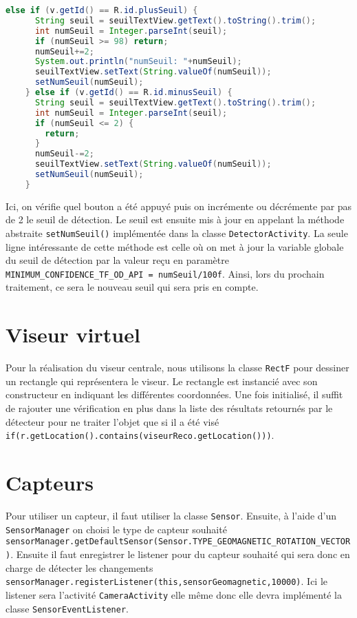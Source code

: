 \documentclass[UTF8]{EPURapport}
\begin{document}
\begin{lstlisting}[language=Java]
	else if (v.getId() == R.id.plusSeuil) {
      String seuil = seuilTextView.getText().toString().trim();
      int numSeuil = Integer.parseInt(seuil);
      if (numSeuil >= 98) return;
      numSeuil+=2;
      System.out.println("numSeuil: "+numSeuil);
      seuilTextView.setText(String.valueOf(numSeuil));
      setNumSeuil(numSeuil);
    } else if (v.getId() == R.id.minusSeuil) {
      String seuil = seuilTextView.getText().toString().trim();
      int numSeuil = Integer.parseInt(seuil);
      if (numSeuil <= 2) {
        return;
      }
      numSeuil-=2;
      seuilTextView.setText(String.valueOf(numSeuil));
      setNumSeuil(numSeuil);
    }
\end{lstlisting}

Ici, on vérifie quel bouton a été appuyé puis on incrémente ou décrémente par pas de 2 le seuil de détection. Le seuil est ensuite mis à jour en appelant la méthode abstraite \verb|setNumSeuil()| implémentée dans la classe \verb|DetectorActivity|. La seule ligne intéressante de cette méthode est celle où on met à jour la variable globale du seuil de détection par la valeur reçu en paramètre \verb|MINIMUM_CONFIDENCE_TF_OD_API = numSeuil/100f|. Ainsi, lors du prochain traitement, ce sera le nouveau seuil qui sera pris en compte.

\section{Viseur virtuel}

Pour la réalisation du viseur centrale, nous utilisons la classe \verb|RectF| pour dessiner un rectangle qui représentera le viseur. Le rectangle est instancié avec son constructeur en indiquant les différentes coordonnées. Une fois initialisé, il suffit de rajouter une vérification en plus dans la liste des résultats retournés par le détecteur pour ne traiter l'objet que si il a été visé \verb| if(r.getLocation().contains(viseurReco.getLocation()))|. 

\section{Capteurs}

Pour utiliser un capteur, il faut utiliser la classe \verb|Sensor|. Ensuite, à l'aide d'un \verb|SensorManager| on choisi le type de capteur souhaité \verb|sensorManager.getDefaultSensor(Sensor.TYPE_GEOMAGNETIC_ROTATION_VECTOR)|. Ensuite il faut enregistrer le listener pour du capteur souhaité qui sera donc en charge de détecter les changements \verb|sensorManager.registerListener(this,sensorGeomagnetic,10000)|. Ici le listener sera l'activité \verb|CameraActivity| elle même donc elle devra implémenté la classe \verb|SensorEventListener|.\\
\end{document}
